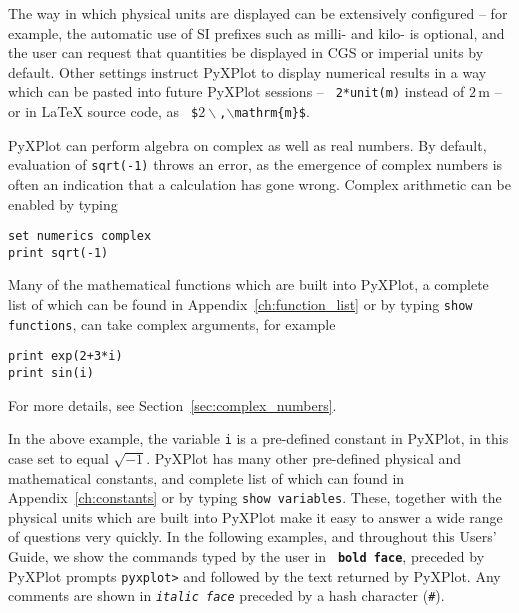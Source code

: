 The way in which physical units are displayed can be extensively configured --
for example, the automatic use of SI prefixes such as milli- and kilo- is
optional, and the user can request that quantities be displayed in CGS or
imperial units by default. Other settings instruct PyXPlot to display numerical
results in a way which can be pasted into future PyXPlot sessions -- {\tt
2*unit(m)} instead of $2\,\mathrm{m}$ -- or in LaTeX source code, as {\tt
\$$2\backslash$,$\backslash$mathrm\{m\}\$}.

PyXPlot can perform algebra on complex as well as real numbers. By default,
evaluation of {\tt sqrt(-1)} throws an error, as the emergence of complex
numbers is often an indication that a calculation has gone wrong.  Complex
arithmetic can be enabled by typing

\begin{verbatim}
set numerics complex
print sqrt(-1)
\end{verbatim}

\noindent Many of the mathematical functions which are built into PyXPlot, a
complete list of which can be found in Appendix~\ref{ch:function_list} or by
typing {\tt show functions}, can take complex arguments, for example

\begin{verbatim}
print exp(2+3*i)
print sin(i)
\end{verbatim}

\noindent For more details, see Section~\ref{sec:complex_numbers}.

In the above example, the variable {\tt i} is a pre-defined constant in
PyXPlot, in this case set to equal $\sqrt{-1}$. PyXPlot has many other
pre-defined physical and mathematical constants, and complete list of which can
found in Appendix~\ref{ch:constants} or by typing {\tt show variables}. These,
together with the physical units which are built into PyXPlot make it easy to
answer a wide range of questions very quickly. In the following examples, and
throughout this Users' Guide, we show the commands typed by the user in {\tt\bf
bold face}, preceded by PyXPlot prompts {\tt pyxplot>} and followed by the text
returned by PyXPlot. Any comments are shown in {\tt\it italic face} preceded by
a hash character ({\tt\it \#}).

